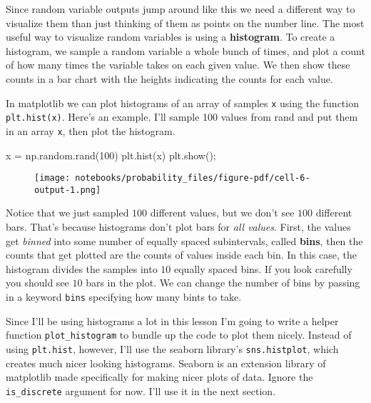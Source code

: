\documentclass[
  letterpaper,
  DIV=11,
  numbers=noendperiod]{scrreprt}
\newenvironment{Shaded}{\begin{snugshade}}{\end{snugshade}}
\newcommand{\DecValTok}[1]{\textcolor[rgb]{0.68,0.00,0.00}{#1}}
\newcommand{\NormalTok}[1]{\textcolor[rgb]{0.00,0.23,0.31}{#1}}
\newcommand{\OperatorTok}[1]{\textcolor[rgb]{0.37,0.37,0.37}{#1}}
\begin{document}
Since random variable outputs jump around like this we need a different
way to visualize them than just thinking of them as points on the number
line. The most useful way to visualize random variables is using a
\textbf{histogram}. To create a histogram, we sample a random variable a
whole bunch of times, and plot a count of how many times the variable
takes on each given value. We then show these counts in a bar chart with
the heights indicating the counts for each value.

In matplotlib we can plot histograms of an array of samples \texttt{x}
using the function \texttt{plt.hist(x)}. Here's an example. I'll sample
100 values from rand and put them in an array \texttt{x}, then plot the
histogram.

\begin{Shaded}
\begin{Highlighting}[]
\NormalTok{x }\OperatorTok{=}\NormalTok{ np.random.rand(}\DecValTok{100}\NormalTok{)}
\NormalTok{plt.hist(x)}
\NormalTok{plt.show()}\OperatorTok{;}
\end{Highlighting}
\end{Shaded}

\begin{figure}[H]

{\centering \texttt{[image: notebooks/probability\_files/figure-pdf/cell-6-output-1.png]}

}

\end{figure}

Notice that we just sampled \(100\) different values, but we don't see
\(100\) different bars. That's because histograms don't plot bars for
\emph{all values}. First, the values get \emph{binned} into some number
of equally spaced subintervals, called \textbf{bins}, then the counts
that get plotted are the counts of values inside each bin. In this case,
the histogram divides the samples into \(10\) equally spaced bins. If
you look carefully you should see \(10\) bars in the plot. We can change
the number of bins by passing in a keyword \texttt{bins} specifying how
many bints to take.

Since I'll be using histograms a lot in this lesson I'm going to write a
helper function \texttt{plot\_histogram} to bundle up the code to plot
them nicely. Instead of using \texttt{plt.hist}, however, I'll use the
seaborn library's \texttt{sns.histplot}, which creates much nicer
looking histograms. Seaborn is an extension library of matplotlib made
specifically for making nicer plots of data. Ignore the
\texttt{is\_discrete} argument for now. I'll use it in the next section.
\end{document}
